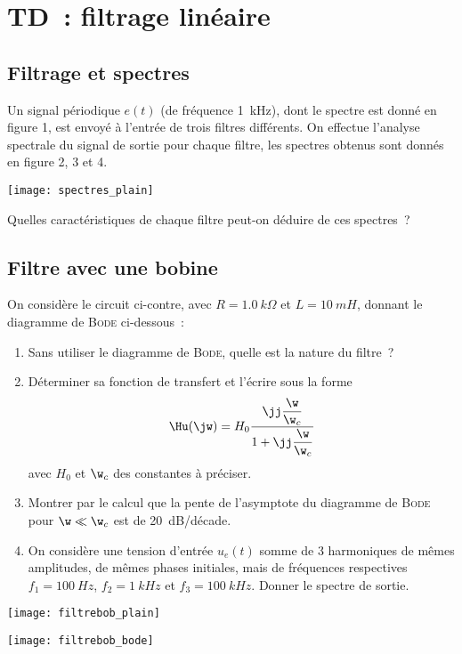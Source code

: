\documentclass[a4paper, 12pt, final, garamond]{book}
\begin{document}
\setcounter{chapter}{6}

\chapter{TD~: filtrage lin\'eaire}

\section{Filtrage et spectres}

Un signal périodique $e(t)$ (de fréquence \SI{1}{kHz}), dont le spectre est
donné en figure 1, est envoyé à l'entrée de trois filtres différents. On
effectue l'analyse spectrale du signal de sortie pour chaque filtre, les
spectres obtenus sont donnés en figure 2, 3 et 4.

\begin{center}
	\texttt{[image: spectres\_plain]}
\end{center}

Quelles caractéristiques de chaque filtre peut-on déduire de ces spectres~?

\section{Filtre avec une bobine}
On considère le circuit ci-contre, avec $R = \SI{1.0}{k\Omega}$ et $L =
	\SI{10}{mH}$, donnant le diagramme de \textsc{Bode} ci-dessous~:

\begin{minipage}{0.60\linewidth}
	\begin{enumerate}
		\item Sans utiliser le diagramme de \textsc{Bode}, quelle est la nature
		      du filtre~?
		\item Déterminer sa fonction de transfert et l'écrire sous la forme
		      \[\Hu(\jw) = H_0 \frac{\jj\dfrac{\w}{\w_c}}{1 +
				      \jj\dfrac{\w}{\w_c}}\]
		      avec $H_0$ et $\w_c$ des constantes à préciser.
		\item Montrer par le calcul que la pente de l'asymptote du diagramme
		      de \textsc{Bode} pour $\w \ll \w_c$ est de \SI{20}{dB/décade}.
		\item On considère une tension d'entrée $u_e(t)$ somme de 3 harmoniques de
		      mêmes amplitudes, de mêmes phases initiales, mais de fréquences
		      respectives $f_1 = \SI{100}{Hz}$, $f_2 = \SI{1}{kHz}$ et $f_3 =
			      \SI{100}{kHz}$. Donner le spectre de sortie.
	\end{enumerate}
\end{minipage}
\hfill
\begin{minipage}{0.35\linewidth}
	\begin{center}
		\hspace{10pt}\texttt{[image: filtrebob\_plain]}
	\end{center}
	\begin{center}
		\texttt{[image: filtrebob\_bode]}
	\end{center}
\end{minipage}
\end{document}
